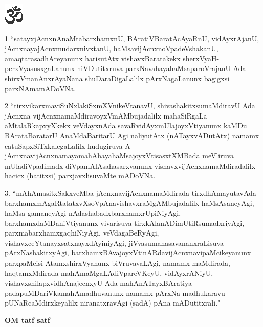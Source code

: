 
\begin{center}
{\includegraphics[scale=1.5]{om.eps}}
\end{center}

1 ``satayxjAcnxnAnaMtabarxhamxnU, BAratiVBaratAcAyaRnU, vidAyxrAjanU, jAcnxnayajAcnxmudarxnivxtanU, haMsavijAcnxnoVpadeVshakanU, amaqtarasadhAreyanunx harisutAtx vishavxBaratakekx  sherxVyaH-perxVyasusxgaLanunx niVDutitxruva parxNavahayahaMsaparoVrajanU Ada shirxVmanAnxrAyaNana shuDaraDigaLalilx pArxNagaLanunx bagigxsi parxNAmamADoVNa.

2 ``tirxvikarxmaviSuNxlakiSxmXVnikeVtanavU, shivashakitxsumaMdiravU Ada jAcnxna vijAcnxnamaMdiravoyxVmAMbujadalilx mahaSiRgaLa aMtalaRkapxyXkekx veVdayxnAda savaRvidAyxmUlajoyxVtiyanunx kaMDu BArataBaratarU AnaMdaBaritarU Agi naliyutAtx (nATayxvADutAtx) namamx catuSapxSiTxkalegaLalilx hudugiruva A jAcnxnavijAcnxnamayamahAhayahaMsajoyxVtisasxtXMBada meVliruva mUladiVpadimadx diVpamAlAsahasarxvanunx vishavxvijAcnxnamaMdiradalilx hacicx (hatitxsi) parxjavxlisuvaMte mADoVNa.

3. ``mAhAmasitxSakxveMba jAcnxnavijAcnxnamaMdirada tirxdhAmayutavAda barxhamxmAgaRtatatxvXsoVpAnavishavxraMgAMbujadalilx haMsAsaneyAgi, haMsa gamaneyAgi nAdashabadxbarxhamxrUpiNiyAgi, barxhamxdaMDaniVtiyanunx vivarisuva tirxkAlanADimUtiRsumadxriyAgi, parxmabarxhamxgaqhiNiyAgi, veVdagaBeRyAgi, vishavxceYtanayxsatxnayxdAyiniyAgi, jiVvasumanasavananxraLisuva pArxNashakitxyAgi, barxhamxBAvajoyxVtinARdavijAcnxnavipaMcikeyanunx parxpaMcisi AtamxshirxVyanunx biVruvavaLAgi, namamx maMdirada, haqtamxMdirada mahAmaMgaLAdiVpareVKeyU, vidAyxrANiyU, vishavxshilapxvidhAnajecnxyU Ada mahAnATayxBAratiya padapuMDariVkamahAmadhuvanunx namamx pArxNa madhukaravu pUNaRcaMdirxkeyalilx niranatxravAgi (sadA) pAna mADutitxrali."

\vskip 20pt
\centerline{{\bf OM tatf satf}}
